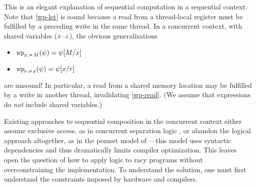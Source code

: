 This is an elegant explanation of sequential computation in a sequential
context. Note that \ref{wp-let} is sound because a read from a thread-local
register must be fulfilled by a preceding write in the same thread.
In a concurrent context, with shared variables
($x$--$z$), the obvious generalizations
\begin{multicols}{2}
\begin{itemize}
\item[{\labeltext[\textsc{d}2b]{(\textsc{d}2b)}{wp-write}}] $\fwp{\LET{\aLoc}{\aExp}}{\bForm} = \bForm[\aExp/\aLoc]$
\item[{\labeltext[\textsc{d}2c]{(\textsc{d}2c)}{wp-read}}] $\fwp{\LET{\aReg}{\aLoc}}{\bForm} = \bForm[\aLoc/\aReg]$
\end{itemize}
\end{multicols}
\noindent
are unsound!  In particular, a read from a shared memory location may be fulfilled by a write
in another thread, invalidating \ref{wp-read}.  (We assume that expressions
do \emph{not} include shared variables.) %

Existing approaches to sequential composition in the concurrent context
either assume exclusive access, as in concurrent separation logic
\cite{OHearn:2007:RCL:1235896.1236121}, or abandon the logical approach
altogether, as in the pomset model of
\citet{DBLP:journals/corr/abs-1804-04214}---this model uses syntactic
dependencies and thus dramatically limits compiler optimization.  This leaves
open the question of how to apply logic to racy programs without
overconstraining the implementation.  To understand the solution, one must first
understand the constraints imposed by hardware and compilers.




